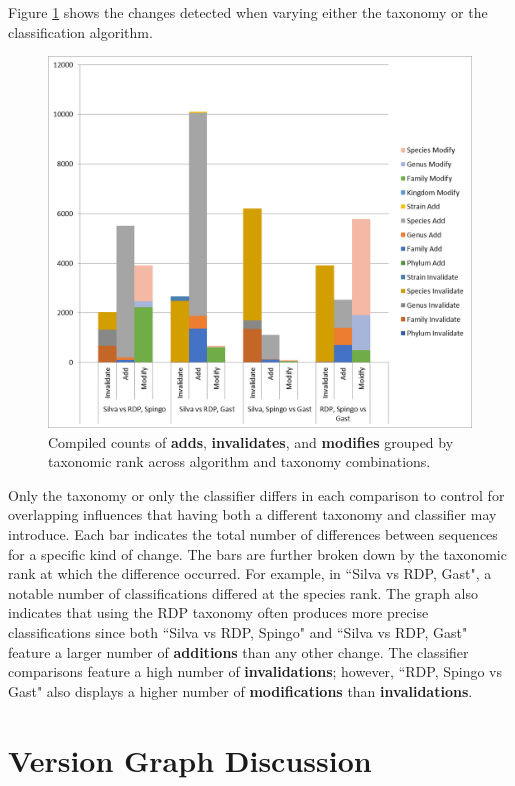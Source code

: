 Figure \ref{mbvl_chart} shows the changes detected when varying either the taxonomy or the classification algorithm.
\begin{figure}
	\centering
	\includegraphics[scale=0.75]{figures/mbvl_chart.png}
	\caption{Compiled counts of \textbf{adds}, \textbf{invalidates}, and \textbf{modifies} grouped by taxonomic rank across algorithm and taxonomy combinations.}
	\label{mbvl_chart}
\end{figure}
Only the taxonomy or only the classifier differs in each comparison to control for overlapping influences that having both a different taxonomy and classifier may introduce.
Each bar indicates the total number of differences between sequences for a specific kind of change.
The bars are further broken down by the taxonomic rank at which the difference occurred.
For example, in ``Silva vs RDP, Gast", a notable number of classifications differed at the species rank.
The graph also indicates that using the RDP taxonomy often produces more precise classifications since both ``Silva vs RDP, Spingo" and ``Silva vs RDP, Gast" feature a larger number of \textbf{additions} than any other change.
The classifier comparisons feature a high number of \textbf{invalidations}; however, ``RDP, Spingo vs Gast" also displays a higher number of \textbf{modifications} than \textbf{invalidations}.

\section{Version Graph Discussion}

